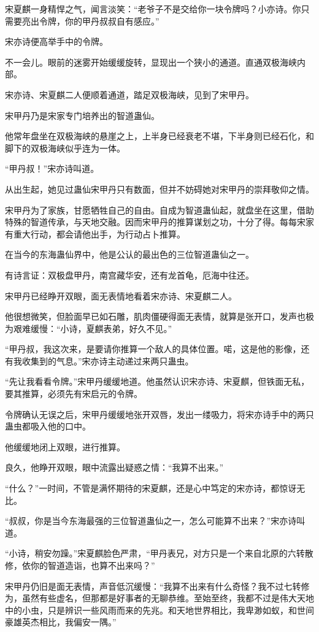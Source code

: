 \begin{this_body}
宋夏麒一身精悍之气，闻言淡笑：“老爷子不是交给你一块令牌吗？小亦诗。你只需要亮出令牌，你的甲丹叔叔自有感应。”

宋亦诗便高举手中的令牌。

不一会儿。眼前的迷雾开始缓缓旋转，显现出一个狭小的通道。直通双极海峡内部。

宋亦诗、宋夏麒二人便顺着通道，踏足双极海峡，见到了宋甲丹。

宋甲丹乃是宋家专门培养出的智道蛊仙。

他常年盘坐在双极海峡的悬崖之上，上半身已经衰老不堪，下半身则已经石化，和脚下的双极海峡似乎连为一体。

“甲丹叔！”宋亦诗叫道。

从出生起，她见过蛊仙宋甲丹只有数面，但并不妨碍她对宋甲丹的崇拜敬仰之情。

宋甲丹为了家族，甘愿牺牲自己的自由。自成为智道蛊仙起，就盘坐在这里，借助特殊的智道传承，与天地交融。因而宋甲丹的推算谋划之功，十分了得。每每宋家有重大行动，都会请他出手，为行动占卜推算。

在当今的东海蛊仙界中，他是公认的最出色的三位智道蛊仙之一。

有诗言证：双极盘甲丹，南宫藏华安，还有龙首龟，厄海中往还。

宋甲丹已经睁开双眼，面无表情地看着宋亦诗、宋夏麒二人。

他很想微笑，但脸面早已如石雕，肌肉僵硬得面无表情，就算是张开口，发声也极为艰难缓慢：“小诗，夏麒表弟，好久不见。”

“甲丹叔，我这次来，是要请你推算一个敌人的具体位置。喏，这是他的影像，还有我收集到的气息。”宋亦诗主动递过来两只蛊虫。

“先让我看看令牌。”宋甲丹缓缓地道。他虽然认识宋亦诗、宋夏麒，但铁面无私，要其推算，必须先有宋启元的令牌。

令牌确认无误之后，宋甲丹缓缓地张开双唇，发出一缕吸力，将宋亦诗手中的两只蛊虫都吸入他的口中。

他缓缓地闭上双眼，进行推算。

良久，他睁开双眼，眼中流露出疑惑之情：“我算不出来。”

“什么？”一时间，不管是满怀期待的宋夏麒，还是心中笃定的宋亦诗，都惊讶无比。

“叔叔，你是当今东海最强的三位智道蛊仙之一，怎么可能算不出来？”宋亦诗叫道。

“小诗，稍安勿躁。”宋夏麒脸色严肃，“甲丹表兄，对方只是一个来自北原的六转散修，依你的智道造诣，也算不出来吗？”

宋甲丹仍旧是面无表情，声音低沉缓慢：“我算不出来有什么奇怪？我不过七转修为，虽然有些虚名，但那都是好事者的无聊恭维。至始至终，我都不过是伟大天地中的小虫，只是辨识一些风雨而来的先兆。和天地世界相比，我卑渺如蚁，和世间豪雄英杰相比，我偏安一隅。”


\end{this_body}
